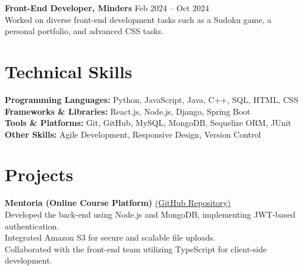 \textbf{Front-End Developer, Minders} \hfill Feb 2024 -- Oct 2024 \\
\textbullet{}\hspace{2mm} Worked on diverse front-end development tasks such as a Sudoku game, a personal portfolio, and advanced CSS tasks.


\section*{Technical Skills}
\textbf{Programming Languages:} Python, JavaScript, Java, C++, SQL, HTML, CSS \\
\textbf{Frameworks \& Libraries:} React.js, Node.js, Django, Spring Boot \\
\textbf{Tools \& Platforms:} Git, GitHub, MySQL, MongoDB, Sequelize ORM, JUnit \\
\textbf{Other Skills:} Agile Development, Responsive Design, Version Control




\section*{Projects}
\textbf{Mentoria (Online Course Platform)} \href{https://github.com/YassenAli/Mentoria}{{(GitHub Repository)}}  \\      
\textbullet{}\hspace{2mm} Developed the back-end using Node.js and MongoDB, implementing JWT-based authentication.  \\  
\textbullet{}\hspace{2mm} Integrated Amazon S3 for secure and scalable file uploads.  \\  
\textbullet{}\hspace{2mm} Collaborated with the front-end team utilizing TypeScript for client-side development.  

